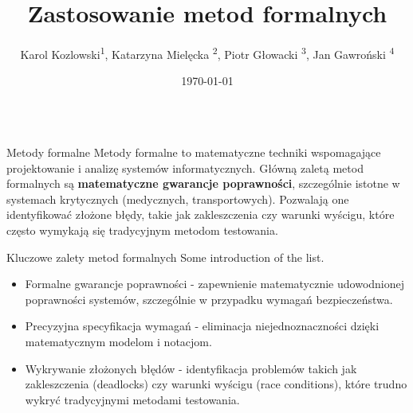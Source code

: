 \documentclass{purdue-poster}
\title{\Huge{Zastosowanie metod formalnych}}
\author{\Large{Karol Kozlowski\texorpdfstring{\textsuperscript{1}}{}, Katarzyna Mielęcka \texorpdfstring{\textsuperscript{2}}{}, Piotr Głowacki \texorpdfstring{\textsuperscript{3}}{}, Jan Gawroński \texorpdfstring{\textsuperscript{4}}{}}}
\institute
{\large{Politechnika Warszawska},\\
Wydzial Elektryczny}
\date{\today}
\begin{document}
\begin{frame}{}
    \begin{columns}[T]
    \begin{column}{.48\linewidth}
    \begin{block}{Metody formalne}
        Metody formalne to matematyczne techniki wspomagające projektowanie i analizę 
        systemów informatycznych. Główną zaletą metod formalnych są \textbf{matematyczne gwarancje poprawności}, 
        szczególnie istotne w systemach krytycznych (medycznych, transportowych).
        Pozwalają one identyfikować złożone błędy, takie jak zakleszczenia czy warunki wyścigu, 
        które często wymykają się tradycyjnym metodom testowania. 

    \end{block}

    \begin{block}{Kluczowe zalety metod formalnych}
        Some introduction of the list.
        \begin{itemize}
            \item Formalne gwarancje poprawności - zapewnienie matematycznie udowodnionej poprawności systemów, szczególnie w przypadku wymagań bezpieczeństwa.
            \item Precyzyjna specyfikacja wymagań - eliminacja niejednoznaczności dzięki matematycznym modelom i notacjom.
            \item Wykrywanie złożonych błędów - identyfikacja problemów takich jak zakleszczenia (deadlocks) czy warunki wyścigu (race conditions), które trudno wykryć tradycyjnymi metodami testowania.
        \end{itemize}
    \end{block}



\end{column}
\end{columns}
\end{frame}
\end{document}
